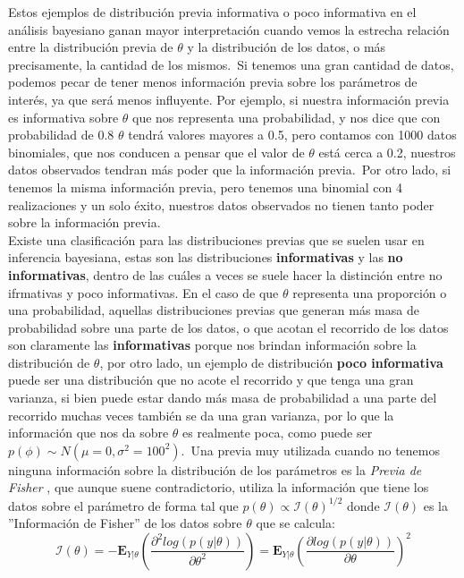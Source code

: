 \documentclass[12pt]{article}
\begin{document}
Estos ejemplos de distribución previa informativa o poco informativa en el análisis bayesiano ganan mayor interpretación cuando vemos la estrecha relación entre la distribución previa de $\theta$ y la distribución de los datos, o más precisamente, la cantidad de los mismos.\
Si tenemos una gran cantidad de datos, podemos pecar de tener menos información previa sobre los parámetros de interés, ya que será menos influyente. Por ejemplo, si nuestra información previa es informativa sobre $\theta$ que nos representa una probabilidad, y nos dice que con probabilidad de 0.8 $\theta$ tendrá valores mayores a 0.5, pero contamos con 1000 datos binomiales, que nos conducen a pensar que el valor de $\theta$ está cerca a 0.2, nuestros datos observados tendran más poder que la información previa.\
Por otro lado, si tenemos la misma información previa, pero tenemos una binomial con 4 realizaciones y un solo éxito, nuestros datos observados no tienen tanto poder sobre la información previa.\\

Existe una clasificación para las distribuciones previas que se suelen usar en inferencia bayesiana, estas son las distribuciones \textbf{informativas} y las \textbf{no informativas}, dentro de las cuáles a veces se suele hacer la distinción entre no ifrmativas y poco informativas. En el caso de que $\theta$ representa una proporción o una probabilidad, aquellas distribuciones previas que generan más masa de probabilidad sobre una parte de los datos, o que acotan el recorrido de los datos son claramente las \textbf{informativas} porque nos brindan información sobre la distribución de $\theta$, por otro lado, un ejemplo de distribución \textbf{poco informativa} puede ser una distribución que no acote el recorrido y que tenga una gran varianza, si bien puede estar dando más masa de probabilidad a una parte del recorrido muchas veces también se da una gran varianza, por lo que la información que nos da sobre $\theta$ es realmente poca, como puede ser $p(\phi)\sim N(\mu=0,\sigma^2=100^2)$.\
Una previa muy utilizada cuando no tenemos ninguna información sobre la distribución de los parámetros es la \textit{Previa de Fisher} \cite{hoff_first_2009}, que aunque suene contradictorio, utiliza la información que tiene los datos sobre el parámetro de forma tal que $p(\theta)\propto \mathcal{I}(\theta)^{1/2}$ donde $\mathcal{I}(\theta)$ es la ''Información de Fisher'' de los datos sobre $\theta$ que se calcula:\\

\[
\mathcal{I}(\theta)=-\mathbf{E}_{Y|\theta} \left(\frac{\partial^2log (p(y|\theta))}{\partial \theta^2}\right) = \mathbf{E}_{Y|\theta} \left(\frac{\partial log (p(y|\theta))}{\partial \theta}\right)^2
\]
\end{document}
